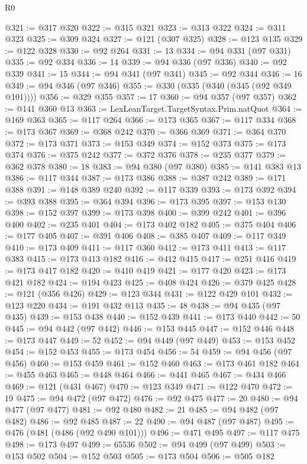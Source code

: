 \begin{lexlean}{R0}
\begin{coremodule}
@321 := @317 @320
@322 := @315 @321
@323 := @313 @322
@324 := @311 @323
@325 := @309 @324
@327 := @121 (@307 @325)
@328 := @123 @135
@329 := @122 @328
@330 := @92 @264
@331 := 13
@334 := @94 @331 (@97 @331)
@335 := @92 @334
@336 := 14
@339 := @94 @336 (@97 @336)
@340 := @92 @339
@341 := 15
@344 := @94 @341 (@97 @341)
@345 := @92 @344
@346 := 16
@349 := @94 @346 (@97 @346)
@355 := @330 (@335 (@340 (@345 (@92 @349 @101))))
@356 := @329 @355
@357 := 17
@360 := @94 @357 (@97 @357)
@362 := @141 @360 @13
@363 := LexLeanTarget.TargetSyntax.Prim.natQuot
@364 := @169 @363
@365 := @117 @264
@366 := @173 @365
@367 := @117 @334
@368 := @173 @367
@369 := @368 @242
@370 := @366 @369
@371 := @364 @370
@372 := @173 @371
@373 := @153 @349
@374 := @152 @373
@375 := @173 @374
@376 := @375 @242
@377 := @372 @376
@378 := @235 @377
@379 := @362 @378
@380 := 18
@383 := @94 @380 (@97 @380)
@385 := @141 @383 @13
@386 := @117 @344
@387 := @173 @386
@388 := @387 @242
@389 := @171 @388
@391 := @148 @389 @240
@392 := @117 @339
@393 := @173 @392
@394 := @393 @388
@395 := @364 @394
@396 := @173 @395
@397 := @153 @130
@398 := @152 @397
@399 := @173 @398
@400 := @399 @242
@401 := @396 @400
@402 := @235 @401
@404 := @173 @402 @182
@405 := @375 @404
@406 := @177 @405
@407 := @391 @406
@408 := @385 @407
@409 := @117 @349
@410 := @173 @409
@411 := @117 @360
@412 := @173 @411
@413 := @117 @383
@415 := @173 @413 @182
@416 := @412 @415
@417 := @251 @416
@419 := @173 @417 @182
@420 := @410 @419
@421 := @177 @420
@423 := @173 @421 @182
@424 := @194 @423
@425 := @408 @424
@426 := @379 @425
@428 := @121 (@356 @426)
@429 := @123 @344
@431 := @122 @429 @101
@432 := @123 @220
@434 := @191 @432 @113
@435 := 48
@438 := @94 @435 (@97 @435)
@439 := @153 @438
@440 := @152 @439
@441 := @173 @440
@442 := 50
@445 := @94 @442 (@97 @442)
@446 := @153 @445
@447 := @152 @446
@448 := @173 @447
@449 := 52
@452 := @94 @449 (@97 @449)
@453 := @153 @452
@454 := @152 @453
@455 := @173 @454
@456 := 54
@459 := @94 @456 (@97 @456)
@460 := @153 @459
@461 := @152 @460
@463 := @173 @461 @182
@464 := @455 @463
@465 := @448 @464
@466 := @441 @465
@467 := @434 @466
@469 := @121 (@431 @467)
@470 := @123 @349
@471 := @122 @470
@472 := 19
@475 := @94 @472 (@97 @472)
@476 := @92 @475
@477 := 20
@480 := @94 @477 (@97 @477)
@481 := @92 @480
@482 := 21
@485 := @94 @482 (@97 @482)
@486 := @92 @485
@487 := 22
@490 := @94 @487 (@97 @487)
@495 := @476 (@481 (@486 (@92 @490 @101)))
@496 := @471 @495
@497 := @117 @475
@498 := @173 @497
@499 := 65536
@502 := @94 @499 (@97 @499)
@503 := @153 @502
@504 := @152 @503
@505 := @173 @504
@506 := @505 @182

\end{coremodule}
\end{lexlean}
